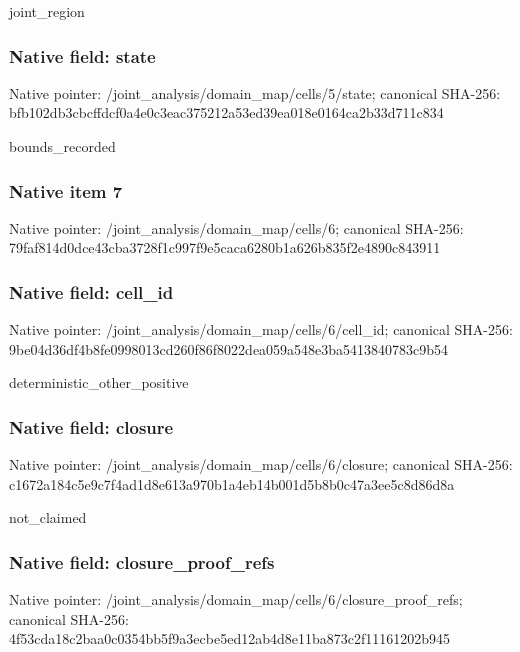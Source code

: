 \documentclass[10pt,a4paper]{article}
\begin{document}
\begingroup\raggedright\sloppy joint\_\allowbreak{}region\par\endgroup

\subsubsection{Native field: state}
Native pointer: /joint\_\allowbreak{}analysis/domain\_\allowbreak{}map/cells/5/state; canonical SHA-256: bfb102db3cbcffdcf0a4e0c3eac375212a53ed39ea018e0164ca2b33d711c834

\begingroup\raggedright\sloppy bounds\_\allowbreak{}recorded\par\endgroup

\subsubsection{Native item 7}
Native pointer: /joint\_\allowbreak{}analysis/domain\_\allowbreak{}map/cells/6; canonical SHA-256: 79faf814d0dce43cba3728f1c997f9e5caca6280b1a626b835f2e4890c843911

\subsubsection{Native field: cell\_\allowbreak{}id}
Native pointer: /joint\_\allowbreak{}analysis/domain\_\allowbreak{}map/cells/6/cell\_\allowbreak{}id; canonical SHA-256: 9be04d36df4b8fe0998013cd260f86f8022dea059a548e3ba5413840783c9b54

\begingroup\raggedright\sloppy deterministic\_\allowbreak{}other\_\allowbreak{}positive\par\endgroup

\subsubsection{Native field: closure}
Native pointer: /joint\_\allowbreak{}analysis/domain\_\allowbreak{}map/cells/6/closure; canonical SHA-256: c1672a184c5e9c7f4ad1d8e613a970b1a4eb14b001d5b8b0c47a3ee5c8d86d8a

\begingroup\raggedright\sloppy not\_\allowbreak{}claimed\par\endgroup

\subsubsection{Native field: closure\_\allowbreak{}proof\_\allowbreak{}refs}
Native pointer: /joint\_\allowbreak{}analysis/domain\_\allowbreak{}map/cells/6/closure\_\allowbreak{}proof\_\allowbreak{}refs; canonical SHA-256: 4f53cda18c2baa0c0354bb5f9a3ecbe5ed12ab4d8e11ba873c2f11161202b945
\end{document}
